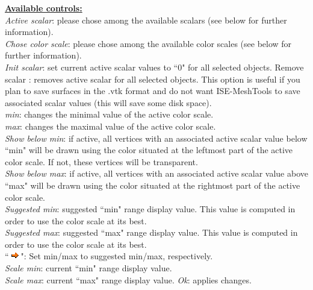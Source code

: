 \noindent
\textbf{\underline{Available controls:}}\\
\textit{Active scalar}: please chose among
the available scalars (see below for further
information).\\
\textit{Chose color scale}: please chose among
the available color scales (see below for
further information).\\


\textit{Init scalar}: set current active scalar values to ``0" for all selected objects.
Remove scalar : removes active scalar for all selected objects. This option is useful if you plan to save surfaces in the .vtk format and do not want ISE-MeshTools to save associated scalar values (this will save some disk space).\\
\textit{min}: changes the minimal value of the active color scale.\\
\textit{max}: changes the maximal value of the active color scale.\\
\textit{Show below min}: if active, all vertices with an associated active scalar value below ``min" will be drawn using the color situated at the leftmost part of the active color scale. If not, these vertices will be transparent.\\
\textit{Show below max}: if active, all vertices with an associated active scalar value above ``max" will be drawn using the color situated at the rightmost part of the active color scale.\\
\textit{Suggested min}: suggested ``min" range display value. This value is computed in order to use the
color scale at its best.\\
\textit{Suggested max}: suggested ``max" range display value. This value is computed in order to use the
color scale at its best.\\
``\includegraphics[scale=0.7]{images/pixmap/s_right_132.png}": Set min/max to suggested min/max, respectively.\\
\textit{Scale min}: current ``min" range display value.\\
\textit{Scale max}: current ``max" range display value.
\textit{Ok}: applies changes.


